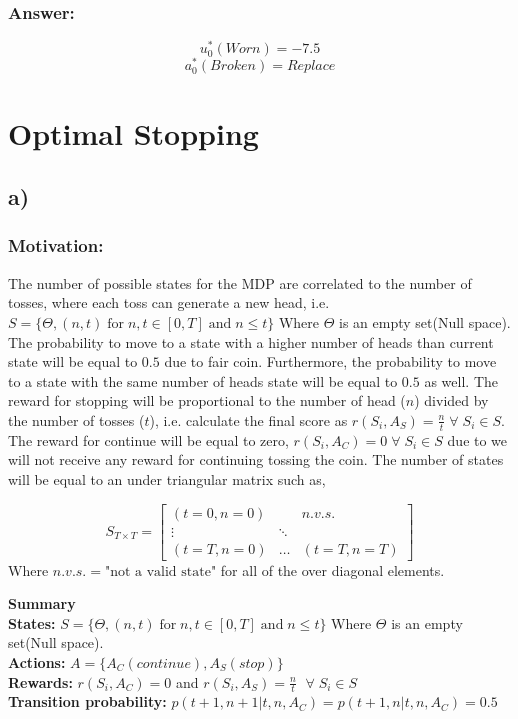\documentclass{article}
\begin{document}
\subsubsection*{Answer:}
$$u^*_0(Worn)= -7.5$$
$$a^*_0(Broken)=Replace$$


\section{Optimal Stopping}
\subsection*{a)}
\subsubsection*{Motivation:}
The number of possible states for the MDP are correlated to the number of tosses, where each toss can generate a new head, i.e. $S = \{\Theta ,(n, t) \; \text{for} \; n,t\in [0,T] \; \text{and} \; n\leq t\}$ Where $\Theta$ is an empty set(Null space). The probability to move to a state with a higher number of heads than current state will be equal to $0.5$ due to fair coin. Furthermore, the probability to move to a state with the same number of heads state will be equal to $0.5$ as well. The reward for stopping will be proportional to the number of head ($n$) divided by the number of tosses ($t$), i.e. calculate the final score as $r(S_i, A_S) = \frac{n}{t} \; \forall \; S_i \in S$. The reward for continue will be equal to zero, $r(S_i, A_C) = 0 \; \forall \; S_i \in S $ due to we will not receive any reward for continuing tossing the coin. The number of states will be equal to an under triangular matrix such as, 

\[
S_{T\times T} = \begin{bmatrix} 
    (t=0, n=0) &  & n.v.s. \\
    \vdots & \ddots & \\
    (t=T, n=0) & \dots& (t=T, n=T) 
    \end{bmatrix}
\]
Where  $n.v.s. =\text{"not a valid state"}$ for all of the over diagonal elements.

\textbf{Summary}\\
\textbf{States:} $S = \{\Theta ,(n, t) \; \text{for} \; n,t\in [0,T] \; \text{and} \; n\leq t\}$ Where $\Theta$ is an empty set(Null space).\\
\textbf{Actions:} $A = \{A_C(continue), A_S(stop)\}$ \\
\textbf{Rewards:}  $r(S_i, A_C) = 0$ and $r(S_i, A_S) = \frac{n}{t}$ $ \; \forall \; S_i \in S$  \\
\textbf{Transition probability:} $p(t+1, n+1|t, n, A_C)=p(t+1, n|t, n, A_C)=0.5$
\end{document}
